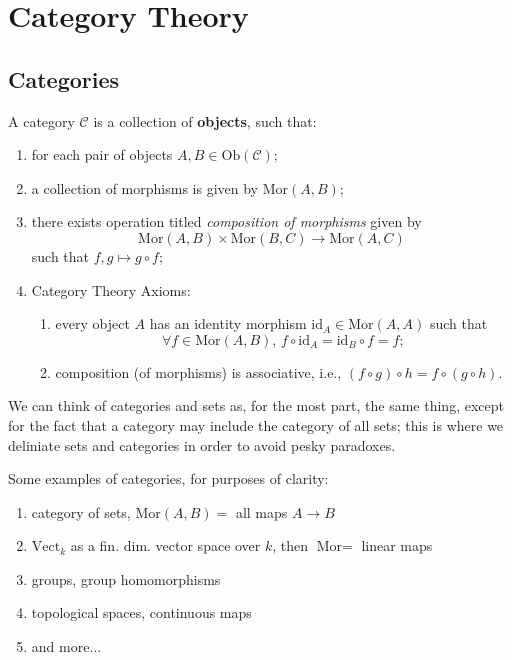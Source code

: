 \documentclass{report}
\begin{document}

\section{Category Theory}


\subsection{Categories}

\begin{definition}[Category]
  A category \( \mathscr{C} \) is a collection of \textbf{objects}, such that:

  \begin{enumerate}[(i.)]
    \item for each pair of objects \( A,B\in  \text{Ob}(\mathscr{C} )   \);
    \item a collection of morphisms is given by \( \text{Mor}(A,B) \);
    \item there exists operation titled \textit{composition of morphisms} given by \[ \text{Mor}(A,B)\times \text{Mor}(B,C) \to \text{Mor}(A,C) \] such that \( f,g \mapsto g \circ f \);
    \item Category Theory Axioms: \begin{enumerate}
        \item every object \( A \) has an identity morphism \( \text{id}_A \in  \text{Mor}(A,A) \) such that \[ \forall f \in  \text{Mor}(A,B), \, f \circ \text{id}_A=\text{id}_B\circ f=f ;\]
        \item composition (of morphisms) is associative, i.e., \( (f\circ g)\circ h= f\circ (g\circ h) \).
    \end{enumerate}
\end{enumerate}

\end{definition}

We can think of categories and sets as, for the most part, the same thing, except for the fact that a category may include the category of all sets; this is where we deliniate sets and categories in order to avoid pesky paradoxes. 

Some examples of categories, for purposes of clarity:
\begin{enumerate}
  \item category of sets, \( \text{Mor}(A,B)= \) all maps \( A \to  B \)
  \item \( \text{Vect}_k \) as a fin. dim. vector space over \( k \), then \( \text{Mor}= \) linear maps
  \item groups, group homomorphisms 
  \item topological spaces, continuous maps
  \item and more...
\end{enumerate}
\end{document}
